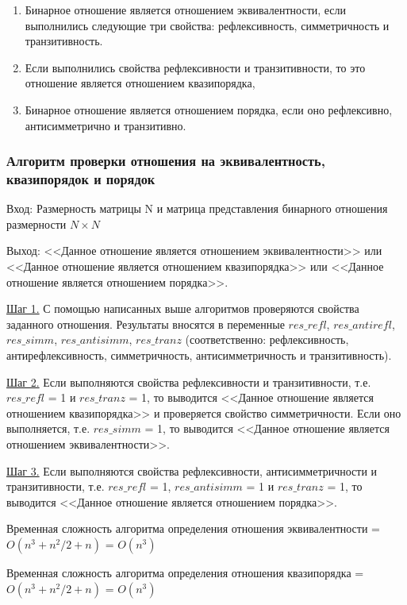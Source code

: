 \documentclass[bachelor, och, labwork]{shiza}
\begin{document}
	\begin{enumerate}
		\item Бинарное отношение является отношением эквивалентности, если выполнились следующие три свойства: рефлексивность, симметричность и транзитивность.
		\item Если выполнились свойства рефлексивности и транзитивности, то это отношение является отношением квазипорядка,
		\item Бинарное отношение является отношением порядка, если оно рефлексивно, антисимметрично и транзитивно.
	\end{enumerate}	

	\subsubsection{Алгоритм проверки отношения на эквивалентность, квазипорядок и порядок}
	

	$\textit{Вход:}$ Размерность матрицы N и матрица представления бинарного отношения размерности $N \times N$
	
	$\textit{Выход:}$ <<Данное отношение является отношением эквивалентности>> или <<Данное отношение является отношением квазипорядка>> или <<Данное отношение является отношением порядка>>.
	
	\underline{Шаг 1.} С помощью написанных выше алгоритмов проверяются свойства заданного отношения. Результаты вносятся в переменные $res\_refl$, $res\_antirefl$, $res\_simm$, $res\_antisimm$, $res\_tranz$ (соответственно: рефлексивность, антирефлексивность, симметричность, антисимметричность и транзитивность).
	
	\underline{Шаг 2.} Если выполняются свойства рефлексивности и транзитивности, т.е. $res\_refl$ = 1 и $res\_tranz$ = 1, то выводится <<Данное отношение является отношением квазипорядка>> и проверяется свойство симметричности. Если оно выполняется, т.е. $res\_simm$ = 1, то выводится <<Данное отношение является отношением эквивалентности>>.
	
	\underline{Шаг 3.} Если выполняются свойства рефлексивности, антисимметричности и транзитивности, т.е. $res\_refl$ = 1, $res\_antisimm$ = 1 и $res\_tranz$ = 1, то выводится <<Данное отношение является отношением порядка>>.
	
	
	Временная сложность алгоритма определения отношения эквивалентности = $O(n^3 + n^2/2 + n)$ = $O(n^3)$
	
	Временная сложность алгоритма определения отношения квазипорядка = $O(n^3 + n^2/2 + n)$ = $O(n^3)$
	
\end{document}
